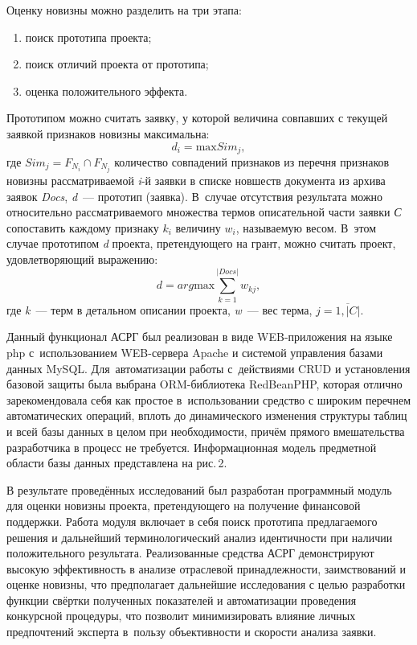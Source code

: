 Оценку новизны можно разделить на три этапа:
\begin{enumerate}[noitemsep]\vspace{-8pt}
    \item поиск прототипа проекта;
    \item поиск отличий проекта от прототипа;
    \item оценка положительного эффекта.
\end{enumerate}\vspace{-8pt}
\clearpage
Прототипом можно считать заявку, у которой величина совпавших с текущей заявкой признаков новизны максимальна:
\begin{equation}
  d_i = \text{max} Sim_j,
\end{equation}
где $Sim_j = F_{N_i} \cap F_{N_j}$ количество совпадений признаков из перечня признаков новизны рассматриваемой \textit{i}-й заявки в списке новшеств документа из архива заявок \textit{Docs}, \textit{d}~--- прототип (заявка). В~случае отсутствия результата можно относительно рассматриваемого множества термов описательной части заявки \textit{С} сопоставить каждому признаку $k_i$ величину $w_i$, называемую весом. В~этом случае прототипом \textit{d} проекта, претендующего на грант, можно считать проект, удовлетворяющий выражению:
\begin{equation}
  d = arg\text{max} \sum_{k=1}^{|Docs|}w_{kj},
\end{equation}
где \textit{k}~--- терм в детальном описании проекта, \textit{w}~--- вес терма, $j=\overline{1,|C|}$.

Данный функционал АСРГ был реализован в виде WEB-приложения на языке php с~использованием WEB-сервера Apache и системой управления базами данных MySQL. Для~автоматизации работы с~действиями CRUD и установления базовой защиты была выбрана ORM-библиотека RedBeanPHP, которая отлично зарекомендовала себя как простое в~использовании средство с широким перечнем автоматических операций, вплоть до динамического изменения структуры таблиц и всей базы данных в целом при необходимости, причём прямого вмешательства разработчика в процесс не требуется. Информационная модель предметной области базы данных представлена на рис.\,2.



В результате проведённых исследований был разработан программный модуль для оценки новизны проекта, претендующего на получение финансовой поддержки. Работа модуля включает в себя поиск прототипа предлагаемого решения и дальнейший терминологический анализ идентичности при наличии положительного результата. Реализованные средства АСРГ демонстрируют высокую эффективность в анализе отраслевой принадлежности, заимствований и оценке новизны, что предполагает дальнейшие исследования с целью разработки функции свёртки полученных показателей и автоматизации проведения конкурсной процедуры, что позволит минимизировать влияние личных предпочтений эксперта в~пользу объективности и скорости анализа заявки.


